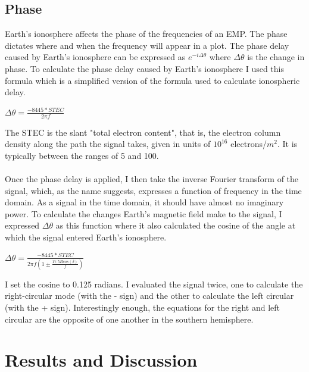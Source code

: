 \documentclass[12pt, reqno]{amsart}
\begin{document}
\subsection{Phase}
\noindent Earth's ionosphere affects the phase of the frequencies of an EMP. The phase dictates where and when the frequency will appear in a plot. The phase delay caused by Earth's ionosphere can be expressed as $e^{-i \Delta \theta}$ where $\Delta\theta$ is the change in phase. To calculate the phase delay caused by Earth's ionosphere I used this formula which is a simplified version of the formula used to calculate ionospheric delay.
\begin{center}
    \large$\Delta \theta = \frac{-8445 *STEC}{2\pi f}$
\end{center}
\noindent The STEC is the slant "total electron content", that is, the electron column density along the path the signal takes, given in units of $10^{16}$ electrons/$m^2$. It is typically between the ranges of 5 and 100.
\\
\\
\noindent Once the phase delay is applied, I then take the inverse Fourier transform of the signal, which, as the name suggests, expresses a function of frequency in the time domain.
As a signal in the time domain, it should have almost no imaginary power. To calculate the changes Earth's magnetic field make to the signal, I expressed $\Delta \theta$ as this function where it also calculated the cosine of the angle at which the signal entered Earth's ionosphere.
\begin{center}
   \Large $\Delta\theta= \frac{-8445*STEC}{2\pi f (1 \pm \frac{17.5Bcos(\delta)}{f})}$
\end{center}

\noindent I set the cosine to 0.125 radians. I evaluated the signal twice, one to calculate the right-circular mode (with the - sign) and the other to calculate the left circular (with the + sign).
Interestingly enough, the equations for the right and left circular are the opposite of one another in the southern hemisphere.

\section{Results and Discussion}
\end{document}
